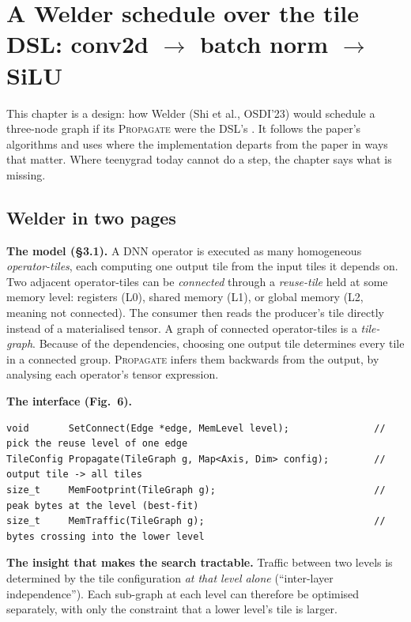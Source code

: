 \section{A Welder schedule over the tile DSL: conv2d $\rightarrow$ batch norm $\rightarrow$ SiLU}
\label{sec:welder}

This chapter is a design: how Welder (Shi et al., OSDI'23) would schedule a
three-node graph if its \textsc{Propagate} were the DSL's . It
follows the paper's algorithms and uses  where the implementation
departs from the paper in ways that matter. Where teenygrad today cannot do a step,
the chapter says what is missing.

\subsection{Welder in two pages}

\textbf{The model (\S3.1).} A DNN operator is executed as many homogeneous
\emph{operator-tiles}, each computing one output tile from the input tiles it
depends on. Two adjacent operator-tiles can be \emph{connected} through a
\emph{reuse-tile} held at some memory level: registers (L0), shared memory (L1), or
global memory (L2, meaning not connected). The consumer then reads the producer's
tile directly instead of a materialised tensor. A graph of connected operator-tiles
is a \emph{tile-graph}. Because of the dependencies, choosing one output tile
determines every tile in a connected group. \textsc{Propagate} infers them backwards
from the output, by analysing each operator's tensor expression.

\textbf{The interface (Fig.~6).}
\begin{lstlisting}
void       SetConnect(Edge *edge, MemLevel level);               // pick the reuse level of one edge
TileConfig Propagate(TileGraph g, Map<Axis, Dim> config);        // output tile -> all tiles
size_t     MemFootprint(TileGraph g);                            // peak bytes at the level (best-fit)
size_t     MemTraffic(TileGraph g);                              // bytes crossing into the lower level
\end{lstlisting}

\textbf{The insight that makes the search tractable.} Traffic between two levels is
determined by the tile configuration \emph{at that level alone} (``inter-layer
independence''). Each sub-graph at each level can therefore be optimised separately,
with only the constraint that a lower level's tile is larger.


